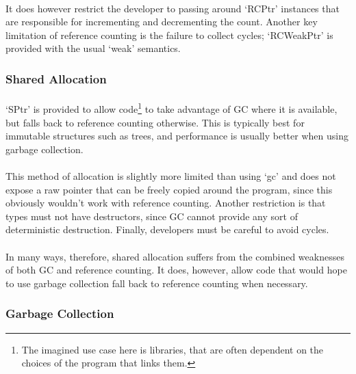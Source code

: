 \documentclass[12pt,twoside,notitlepage]{report}
\begin{document}
\paragraph{}
It does however restrict the developer to passing around `RCPtr' instances that are responsible for incrementing and decrementing the count. Another key limitation of reference counting is the failure to collect cycles; `RCWeakPtr' is provided with the usual `weak' semantics.

\subsubsection{Shared Allocation}

\paragraph{}
`SPtr' is provided to allow code\footnote{The imagined use case here is libraries, that are often dependent on the choices of the program that links them.} to take advantage of GC where it is available, but falls back to reference counting otherwise. This is typically best for immutable structures such as trees, and performance is usually better when using garbage collection.

\paragraph{}
This method of allocation is slightly more limited than using `gc' and does not expose a raw pointer that can be freely copied around the program, since this obviously wouldn't work with reference counting. Another restriction is that types must not have destructors, since GC cannot provide any sort of deterministic destruction. Finally, developers must be careful to avoid cycles.

\paragraph{}
In many ways, therefore, shared allocation suffers from the combined weaknesses of both GC and reference counting. It does, however, allow code that would hope to use garbage collection fall back to reference counting when necessary.

\subsubsection{Garbage Collection}
\end{document}
